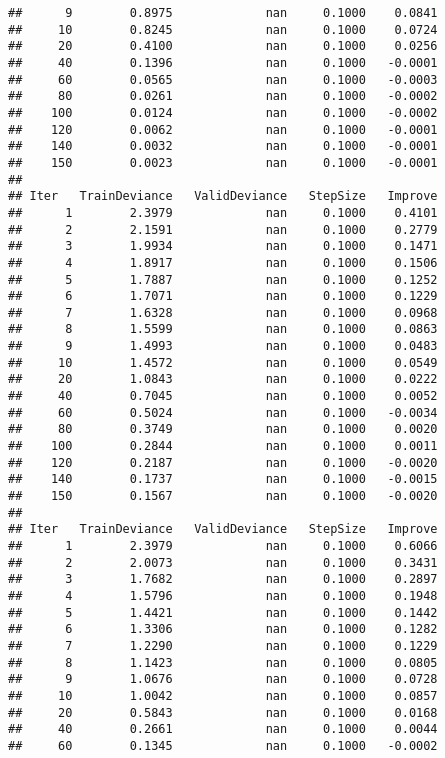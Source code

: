 \documentclass[]{article}
\begin{document}
\begin{verbatim}
##      9        0.8975             nan     0.1000    0.0841
##     10        0.8245             nan     0.1000    0.0724
##     20        0.4100             nan     0.1000    0.0256
##     40        0.1396             nan     0.1000   -0.0001
##     60        0.0565             nan     0.1000   -0.0003
##     80        0.0261             nan     0.1000   -0.0002
##    100        0.0124             nan     0.1000   -0.0002
##    120        0.0062             nan     0.1000   -0.0001
##    140        0.0032             nan     0.1000   -0.0001
##    150        0.0023             nan     0.1000   -0.0001
## 
## Iter   TrainDeviance   ValidDeviance   StepSize   Improve
##      1        2.3979             nan     0.1000    0.4101
##      2        2.1591             nan     0.1000    0.2779
##      3        1.9934             nan     0.1000    0.1471
##      4        1.8917             nan     0.1000    0.1506
##      5        1.7887             nan     0.1000    0.1252
##      6        1.7071             nan     0.1000    0.1229
##      7        1.6328             nan     0.1000    0.0968
##      8        1.5599             nan     0.1000    0.0863
##      9        1.4993             nan     0.1000    0.0483
##     10        1.4572             nan     0.1000    0.0549
##     20        1.0843             nan     0.1000    0.0222
##     40        0.7045             nan     0.1000    0.0052
##     60        0.5024             nan     0.1000   -0.0034
##     80        0.3749             nan     0.1000    0.0020
##    100        0.2844             nan     0.1000    0.0011
##    120        0.2187             nan     0.1000   -0.0020
##    140        0.1737             nan     0.1000   -0.0015
##    150        0.1567             nan     0.1000   -0.0020
## 
## Iter   TrainDeviance   ValidDeviance   StepSize   Improve
##      1        2.3979             nan     0.1000    0.6066
##      2        2.0073             nan     0.1000    0.3431
##      3        1.7682             nan     0.1000    0.2897
##      4        1.5796             nan     0.1000    0.1948
##      5        1.4421             nan     0.1000    0.1442
##      6        1.3306             nan     0.1000    0.1282
##      7        1.2290             nan     0.1000    0.1229
##      8        1.1423             nan     0.1000    0.0805
##      9        1.0676             nan     0.1000    0.0728
##     10        1.0042             nan     0.1000    0.0857
##     20        0.5843             nan     0.1000    0.0168
##     40        0.2661             nan     0.1000    0.0044
##     60        0.1345             nan     0.1000   -0.0002

\end{verbatim}
\end{document}

